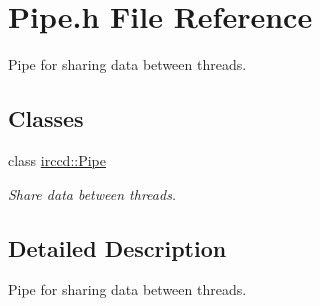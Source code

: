 \hypertarget{a00119}{\section{Pipe.\-h File Reference}
\label{a00119}
}


Pipe for sharing data between threads.  


\subsection*{Classes}
\begin{DoxyCompactItemize}
\item 
class \hyperlink{a00050}{irccd\-::\-Pipe}
\begin{DoxyCompactList}\small\item\em Share data between threads. \end{DoxyCompactList}\end{DoxyCompactItemize}


\subsection{Detailed Description}
Pipe for sharing data between threads. 